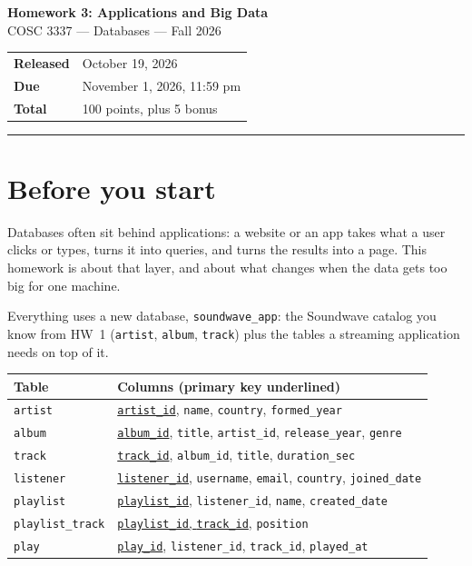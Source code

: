\documentclass[11pt]{article}
\newcommand{\hwnum}{3}
\newcommand{\released}{October 19, 2026}
\newcommand{\due}{November 1, 2026, 11:59 pm}
\newcommand{\code}[1]{\texttt{#1}}
\begin{document}
\begin{center}
  {\LARGE\bfseries Homework \hwnum: Applications and Big Data}\\[4pt]
  {\large COSC 3337 --- Databases --- Fall 2026}\\[6pt]
  \begin{tabular}{@{}ll@{}}
    \textbf{Released} & \released \\
    \textbf{Due}      & \due \\
    \textbf{Total}    & 100 points, plus 5 bonus
  \end{tabular}
\end{center}
\vspace{2pt}\hrule\vspace{10pt}

\section*{Before you start}

Databases often sit behind applications: a website or an app takes what a user clicks or types, turns
it into queries, and turns the results into a page. This homework is about that
layer, and about what changes when the data gets too big for one machine.

Everything uses a new database, \code{soundwave\_app}: the Soundwave catalog you
know from HW~1 (\code{artist}, \code{album}, \code{track}) plus the tables a
streaming application needs on top of it.

\begin{center}
\begin{tabular}{@{}l l@{}}
\toprule
\textbf{Table} & \textbf{Columns} (primary key underlined)\\
\midrule
\code{artist} & \underline{\code{artist\_id}}, \code{name}, \code{country}, \code{formed\_year}\\
\code{album}  & \underline{\code{album\_id}}, \code{title}, \code{artist\_id}, \code{release\_year}, \code{genre}\\
\code{track}  & \underline{\code{track\_id}}, \code{album\_id}, \code{title}, \code{duration\_sec}\\
\midrule
\code{listener}       & \underline{\code{listener\_id}}, \code{username}, \code{email}, \code{country}, \code{joined\_date}\\
\code{playlist}       & \underline{\code{playlist\_id}}, \code{listener\_id}, \code{name}, \code{created\_date}\\
\code{playlist\_track}& \underline{\code{playlist\_id}, \code{track\_id}}, \code{position}\\
\code{play}           & \underline{\code{play\_id}}, \code{listener\_id}, \code{track\_id}, \code{played\_at}\\
\bottomrule
\end{tabular}
\end{center}
\end{document}
